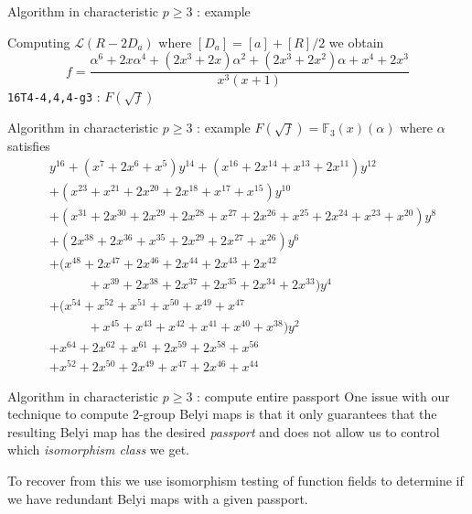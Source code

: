 \documentclass[xcolor=dvipsnames]{beamer}
\theoremstyle{plain}
\newcommand{\FF}{\mathbb{F}}
\begin{document}
{\begin{frame}{Algorithm in characteristic $p\geq 3$ : example}
      \pause\par
      Computing $\mathscr{L}(R-2D_a)$ where
      $[D_a] = [a]+[R]/2$ we obtain
      \[
        f = \frac{\alpha^6 + 2x\alpha^4 + (2x^3 + 2x)\alpha^2 + (2x^3 + 2x^2)\alpha + x^4 + 2x^3}{x^3(x+1)}
      \]
      \pause
      \texttt{16T4-4,4,4-g3} : $F(\sqrt{f})$
    \end{frame}
    \begin{frame}{Algorithm in characteristic $p\geq 3$ : example}
      $F(\sqrt{f}) = \FF_3(x)(\alpha)$ where $\alpha$ satisfies
      \begin{align*}
        &y^{16} + (x^7 + 2x^6 + x^5)y^{14} + (x^{16} + 2x^{14} + x^{13} + 2x^{11})y^{12}\\
        &+ (x^{23} + x^{21} + 2x^{20} + 2x^{18} + x^{17} + x^{15})y^{10}\\
        &+ (x^{31} + 2x^{30} + 2x^{29} + 2x^{28} + x^{27} + 2x^{26} + x^{25} + 2x^{24} + x^{23} + x^{20})y^8\\
        &+ (2x^{38} + 2x^{36} + x^{35} + 2x^{29} + 2x^{27} + x^{26})y^6\\
        &+ (x^{48} + 2x^{47} + 2x^{46} + 2x^{44} + 2x^{43} + 2x^{42}\\
        &\;\;\;\;\;\;\;\;\;\;\,+x^{39} + 2x^{38} + 2x^{37} + 2x^{35} + 2x^{34} + 2x^{33})y^4\\
        &+ (x^{54} + x^{52} + x^{51} + x^{50} + x^{49} + x^{47}\\
        &\;\;\;\;\;\;\;\;\;\;\,+ x^{45} + x^{43} + x^{42} + x^{41} + x^{40} + x^{38})y^2\\
        &+ x^{64} + 2x^{62} + x^{61} + 2x^{59} + 2x^{58} + x^{56}\\
        &+ x^{52} + 2x^{50} + 2x^{49} + x^{47} + 2x^{46} + x^{44}
      \end{align*}
    \end{frame}
    \begin{frame}{Algorithm in characteristic $p\geq 3$ : compute entire passport}
      One issue with our technique
      to compute $2$-group Belyi maps
      is that it only guarantees that the
      resulting Belyi map has the desired
      \emph{passport} and does not allow us
      to control which \emph{isomorphism class} we get.
      \pause\par
      To recover from this we use isomorphism testing
      of function fields to determine if we have
      redundant Belyi maps with a given passport.
      \pause\par

\end{frame}}
\end{document}
